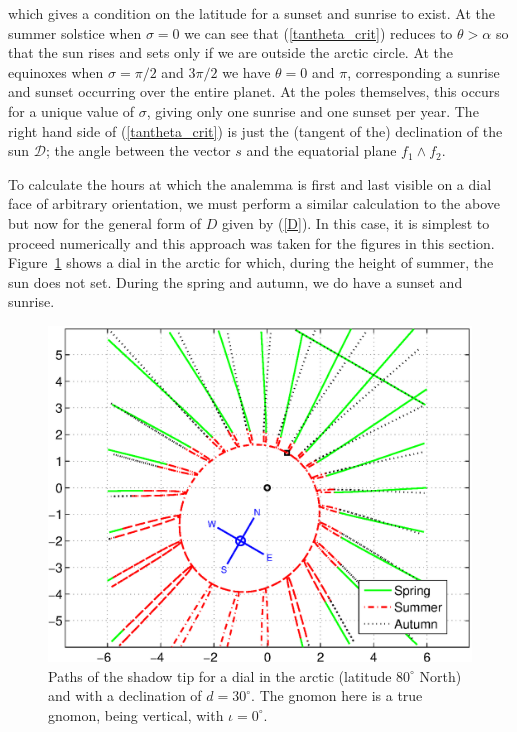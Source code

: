 \documentclass[12pt]{article}
\newcommand{\wdg}{\! \wedge \!}
\begin{document}
%
which gives a condition on the latitude for a sunset and sunrise to exist. At the summer solstice when $\sigma = 0$ we can see that (\ref{tantheta_crit}) reduces to $\theta > \alpha$ so that the sun rises and sets only if we are outside the arctic circle. At the equinoxes when $\sigma = \pi/2$ and $3\pi/2$ we have $\theta = 0$ and $\pi$, corresponding a sunrise and sunset occurring over the entire planet. At the poles themselves, this occurs for a unique value of $\sigma$, giving only one sunrise and one sunset per year. The right hand side of (\ref{tantheta_crit}) is just the (tangent of the) declination of the sun $\mathcal{D}$; the angle between the vector $s$ and the equatorial plane $f_1 \wdg f_2$.

To calculate the hours at which the analemma is first and last visible on a dial face of arbitrary orientation, we must perform a similar calculation to the above but now for the general form of $D$ given by (\ref{D}). In this case, it is simplest to proceed numerically and this approach was taken for the figures in this section. Figure~\ref{articDial} shows a dial in the arctic for which, during the height of summer, the sun does not set. During the spring and autumn, we do have a sunset and sunrise.
%
\begin{figure}[ht!]
\centering
\includegraphics[width=13cm]{figs/figure9.eps} 
\caption{Paths of the shadow tip for a dial in the arctic (latitude $80^\circ$ North) and with a declination of $d = 30^\circ$. The gnomon here is a true gnomon, being vertical, with $\iota = 0^\circ$.\label{articDial}}
\end{figure}
%
\end{document}
